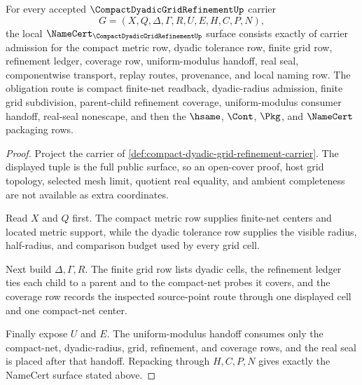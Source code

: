 \begin{theorem}
\label{thm:compact-dyadic-grid-refinement-namecert-obligations}
For every accepted $\CompactDyadicGridRefinementUp$ carrier
$$
G=(X,Q,\Delta,\Gamma,R,U,E,H,C,P,N),
$$
the local $\NameCert_{\CompactDyadicGridRefinementUp}$ surface consists exactly of carrier admission for the compact metric row, dyadic tolerance row, finite grid row, refinement ledger, coverage row, uniform-modulus handoff, real seal, componentwise transport, replay routes, provenance, and local naming row. The obligation route is compact finite-net readback, dyadic-radius admission, finite grid subdivision, parent-child refinement coverage, uniform-modulus consumer handoff, real-seal nonescape, and then the $\hsame$, $\Cont$, $\Pkg$, and $\NameCert$ packaging rows.
\end{theorem}
\begin{proof}
Project the carrier of \autoref{def:compact-dyadic-grid-refinement-carrier}. The displayed tuple is the full public surface, so an open-cover proof, host grid topology, selected mesh limit, quotient real equality, and ambient completeness are not available as extra coordinates.

Read $X$ and $Q$ first. The compact metric row supplies finite-net centers and located metric support, while the dyadic tolerance row supplies the visible radius, half-radius, and comparison budget used by every grid cell.

Next build $\Delta,\Gamma,R$. The finite grid row lists dyadic cells, the refinement ledger ties each child to a parent and to the compact-net probes it covers, and the coverage row records the inspected source-point route through one displayed cell and one compact-net center.

Finally expose $U$ and $E$. The uniform-modulus handoff consumes only the compact-net, dyadic-radius, grid, refinement, and coverage rows, and the real seal is placed after that handoff. Repacking through $H,C,P,N$ gives exactly the NameCert surface stated above.
\end{proof}

